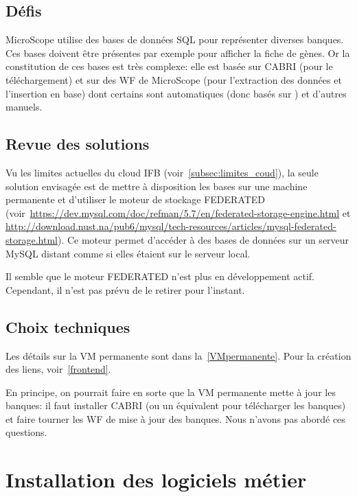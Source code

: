 \subsection{Défis}

MicroScope utilise des bases de données SQL pour représenter diverses banques.
Ces bases doivent être présentes par exemple pour afficher la fiche de gènes.
Or la constitution de ces bases est très complexe:
elle est basée sur CABRI (pour le téléchargement)
et sur des WF de MicroScope (pour l'extraction des données et l'insertion en base)
dont certains sont automatiques (donc basés sur ) et d'autres manuels.

\subsection{Revue des solutions}

Vu les limites actuelles du cloud IFB (voir~\autoref{subsec:limites_coud}),
la seule solution envisagée est de mettre à disposition les bases sur une machine permanente et
d'utiliser le moteur de stockage FEDERATED (voir~\url{https://dev.mysql.com/doc/refman/5.7/en/federated-storage-engine.html} et \url{http://download.nust.na/pub6/mysql/tech-resources/articles/mysql-federated-storage.html}).
Ce moteur permet d'accéder à des bases de données sur un serveur MySQL distant comme si elles étaient sur le serveur local.

\begin{warningbox}
    Il semble que le moteur FEDERATED n'est plus en développement actif.
    Cependant, il n'est pas prévu de le retirer pour l'instant.
\end{warningbox}

\subsection{Choix techniques}

Les détails sur la VM permanente sont dans la~\autoref{VMpermanente}.
Pour la création des liens, voir~\autoref{frontend}.

En principe, on pourrait faire en sorte que la VM permanente mette à jour les banques:
il faut installer CABRI (ou un équivalent pour télécharger les banques) et faire tourner les WF de mise à jour des banques.
Nous n'avons pas abordé ces questions.

\section{Installation des logiciels métier} \label{sec:installation_logiciels_metier}

